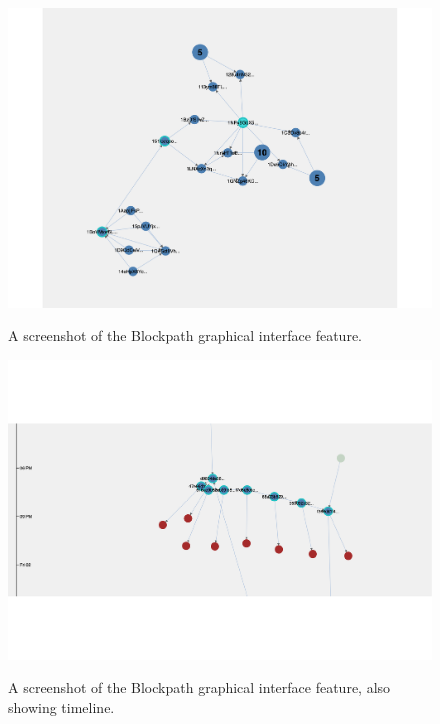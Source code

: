 \begin{figure}[h!]
  \centering
  \includegraphics[width = 15cm]{./figures/blockpath-evaluation}\\[0.5cm] 
  \caption{A screenshot of the Blockpath graphical interface feature.}
  \label{fig:blockpath-graph-ui}
\end{figure}

\begin{figure}[h!]
  \centering
  \includegraphics[width = 15cm]{./figures/blockpath-time-org}\\[0.5cm] 
  \caption{A screenshot of the Blockpath graphical interface feature, also showing timeline.}
  \label{fig:blockpath-graph-ui-time-organisation}
\end{figure}